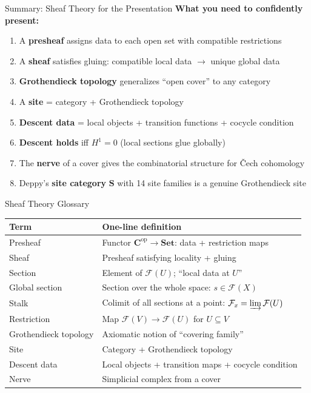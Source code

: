 \documentclass[aspectratio=169,10pt]{beamer}
\newcommand{\Fscr}{\mathcal{F}}
\newcommand{\op}{\mathrm{op}}
\newcommand{\Set}{\mathbf{Set}}
\begin{document}
\begin{frame}{Summary: Sheaf Theory for the Presentation}
\textbf{What you need to confidently present:}

\begin{enumerate}
  \item A \textbf{presheaf} assigns data to each open set with compatible restrictions
  \item A \textbf{sheaf} satisfies gluing: compatible local data $\to$ unique global data
  \item \textbf{Grothendieck topology} generalizes ``open cover'' to any category
  \item A \textbf{site} = category + Grothendieck topology
  \item \textbf{Descent data} = local objects + transition functions + cocycle condition
  \item \textbf{Descent holds} iff $H^1 = 0$ (local sections glue globally)
  \item The \textbf{nerve} of a cover gives the combinatorial structure for \v{C}ech cohomology
  \item Deppy's \textbf{site category} $\mathbf{S}$ with 14 site families is a genuine Grothendieck site
\end{enumerate}
\end{frame}


\begin{frame}{Sheaf Theory Glossary}
\footnotesize
\renewcommand{\arraystretch}{1.2}
\begin{tabular}{@{}lp{8.5cm}@{}}
\toprule
\textbf{Term} & \textbf{One-line definition} \\
\midrule
Presheaf & Functor $\mathbf{C}^{\op} \to \Set$: data + restriction maps \\
Sheaf & Presheaf satisfying locality + gluing \\
Section & Element of $\Fscr(U)$; ``local data at $U$'' \\
Global section & Section over the whole space: $s \in \Fscr(X)$ \\
Stalk & Colimit of all sections at a point: $\Fscr_x = \varinjlim \Fscr(U)$ \\
Restriction & Map $\Fscr(V) \to \Fscr(U)$ for $U \subseteq V$ \\
Grothendieck topology & Axiomatic notion of ``covering family'' \\
Site & Category + Grothendieck topology \\
Descent data & Local objects + transition maps + cocycle condition \\
Nerve & Simplicial complex from a cover \\
\bottomrule
\end{tabular}
\end{frame}
\end{document}
